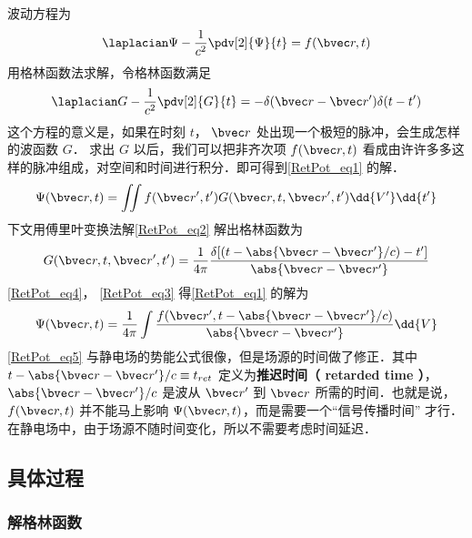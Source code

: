 
波动方程为
\begin{equation}\label{RetPot_eq1}
\laplacian\Psi  - \frac{1}{c^2} \pdv[2]{\Psi}{t} = f(\bvec r, t)
\end{equation} 
用格林函数法求解，令格林函数满足
\begin{equation}\label{RetPot_eq2}
\laplacian G - \frac{1}{c^2} \pdv[2]{G}{t} =  - \delta (\bvec r - \bvec r')\delta (t - t')
\end{equation} 
这个方程的意义是，如果在时刻 $t$， $\bvec r$ 处出现一个极短的脉冲，会生成怎样的波函数 $G$． 求出 $G$ 以后，我们可以把非齐次项 $f(\bvec r, t)$ 看成由许许多多这样的脉冲组成，对空间和时间进行积分．即可得到\autoref{RetPot_eq1} 的解．
\begin{equation}\label{RetPot_eq3}
\Psi(\bvec r, t) = \iint f(\bvec r', t')G(\bvec r,t, \bvec r',t') \dd{V'} \dd{t'} 
\end{equation} 
下文用傅里叶变换法解\autoref{RetPot_eq2} 解出格林函数为
\begin{equation}\label{RetPot_eq4}
G(\bvec r, t, \bvec r', t') = \frac{1}{4\pi} \frac{\delta [(t - \abs{\bvec r - \bvec r'}/c) - t']}{\abs{\bvec r - \bvec r'}}
\end{equation} 
\autoref{RetPot_eq4}， \autoref{RetPot_eq3} 得\autoref{RetPot_eq1} 的解为
\begin{equation}\label{RetPot_eq5}
\Psi(\bvec r, t) = \frac{1}{4\pi } \int \frac{f(\bvec r',t - \abs{\bvec r - \bvec r'}/c)}{\abs{\bvec r - \bvec r'}} \dd{V}
\end{equation} 
\autoref{RetPot_eq5} 与静电场的势能公式很像，但是场源的时间做了修正．其中 $t - \abs{\bvec r - \bvec r'}/c \equiv t_{ret}$ 定义为\textbf{推迟时间（ retarded time ）}， $\abs{\bvec r - \bvec r'}/c$ 是波从 $\bvec r'$ 到 $\bvec r$ 所需的时间．也就是说，$f(\bvec r, t)$ 并不能马上影响 $\Psi(\bvec r, t)$，而是需要一个“信号传播时间” 才行．在静电场中，由于场源不随时间变化，所以不需要考虑时间延迟．

\subsection{具体过程}

\subsubsection{解格林函数}  


